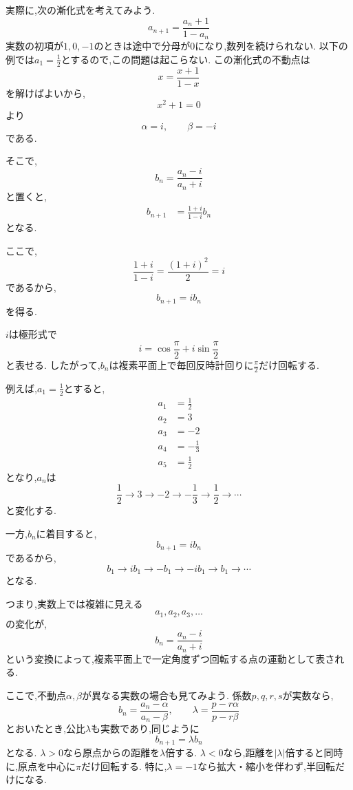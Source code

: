   実際に,次の漸化式を考えてみよう.
  \[
    a_{n+1}=\frac{a_n+1}{1-a_n}
  \]
  実数の初項が$1,0,-1$のときは途中で分母が0になり,数列を続けられない.
  以下の例では$a_1=\frac12$とするので,この問題は起こらない.
  この漸化式の不動点は
  \[
    x=\frac{x+1}{1-x}
  \]
  を解けばよいから,
  \[
    x^2+1=0
  \]
  より
  \[
    \alpha=i,\qquad\beta=-i
  \]
  である.
  
  そこで,
  \[
    b_n=\frac{a_n-i}{a_n+i}
  \]
  と置くと,
  \begin{align*}
    b_{n+1}
    &=
    \frac{1+i}{1-i}b_n
  \end{align*}
  となる.
  
  ここで,
  \[
    \frac{1+i}{1-i}
    =
    \frac{(1+i)^2}{2}
    =i
  \]
  であるから,
  \[
    b_{n+1}=ib_n
  \]
  を得る.
  
  $i$は極形式で
  \[
    i=\cos\frac{\pi}{2}+i\sin\frac{\pi}{2}
  \]
  と表せる.
  したがって,$b_n$は複素平面上で毎回反時計回りに$\frac{\pi}{2}$だけ回転する.
  
  例えば,$a_1=\frac12$とすると,
  \begin{align*}
    a_1&=\frac12\\
    a_2&=3\\
    a_3&=-2\\
    a_4&=-\frac13\\
    a_5&=\frac12
  \end{align*}
  となり,$a_n$は
  \[
    \frac12\longrightarrow3\longrightarrow-2
    \longrightarrow-\frac13\longrightarrow\frac12\longrightarrow\cdots
  \]
  と変化する.
  
  一方,$b_n$に着目すると,
  \[
    b_{n+1}=ib_n
  \]
  であるから,
  \[
    b_1\longrightarrow ib_1\longrightarrow-b_1
    \longrightarrow-ib_1\longrightarrow b_1\longrightarrow\cdots
  \]
  となる.
  
  つまり,実数上では複雑に見える
  \[
    a_1,a_2,a_3,\ldots
  \]
  の変化が,
  \[
    b_n=\frac{a_n-i}{a_n+i}
  \]
  という変換によって,複素平面上で一定角度ずつ回転する点の運動として表される.
  
  ここで,不動点$\alpha,\beta$が異なる実数の場合も見てみよう.
  係数$p,q,r,s$が実数なら,
  \[
    b_n=\frac{a_n-\alpha}{a_n-\beta},
    \qquad
    \lambda=\frac{p-r\alpha}{p-r\beta}
  \]
  とおいたとき,公比$\lambda$も実数であり,同じように
  \[
    b_{n+1}=\lambda b_n
  \]
  となる.
  $\lambda>0$なら原点からの距離を$\lambda$倍する.
  $\lambda<0$なら,距離を$|\lambda|$倍すると同時に,原点を中心に$\pi$だけ回転する.
  特に,$\lambda=-1$なら拡大・縮小を伴わず,半回転だけになる.

